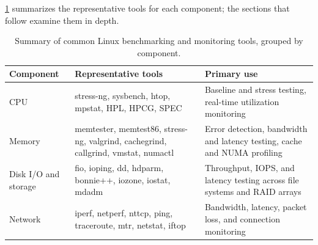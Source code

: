 \medskip

\cref{tab:benchmarking-tools} summarizes the representative tools for each component; the sections that follow examine them in depth.

\begin{table}[H]
    \centering
    \setlength{\tabcolsep}{4pt}
    \renewcommand{\arraystretch}{1.25}
    \begin{tcolorbox}[enhanced, colback=gray!5, boxrule=0.8pt, colframe=black, arc=0mm, left=0mm, right=0mm, top=0.6mm, bottom=0.6mm, boxsep=0mm, sharp corners=south]
        \small
    \begin{tabularx}{\textwidth}{
        >{\raggedright\arraybackslash}p{}
        >{\raggedright\arraybackslash}p{}
        >{\raggedright\arraybackslash}X
    }
        \rowcolor{gray!20}
        \textbf{Component} & \textbf{Representative tools} & \textbf{Primary use} \\
        \midrule
        CPU & \ttfamily\footnotesize{stress-ng}, \ttfamily\footnotesize{sysbench}, \ttfamily\footnotesize{htop}, \ttfamily\footnotesize{mpstat}, HPL, HPCG, SPEC & Baseline and stress testing, real-time utilization monitoring \\
        Memory & \ttfamily\footnotesize{memtester}, memtest86, \ttfamily\footnotesize{stress-ng}, \ttfamily\footnotesize{valgrind}, \ttfamily\footnotesize{cachegrind}, \ttfamily\footnotesize{callgrind}, \ttfamily\footnotesize{vmstat}, \ttfamily\footnotesize{numactl} & Error detection, bandwidth and latency testing, cache and NUMA profiling \\
        Disk I/O and storage & \ttfamily\footnotesize{fio}, \ttfamily\footnotesize{ioping}, \ttfamily\footnotesize{dd}, \ttfamily\footnotesize{hdparm}, \ttfamily\footnotesize{bonnie++}, \ttfamily\footnotesize{iozone}, \ttfamily\footnotesize{iostat}, \ttfamily\footnotesize{mdadm} & Throughput, IOPS, and latency testing across file systems and RAID arrays \\
        Network & \ttfamily\footnotesize{iperf}, \ttfamily\footnotesize{netperf}, \ttfamily\footnotesize{nttcp}, \ttfamily\footnotesize{ping}, \ttfamily\footnotesize{traceroute}, \ttfamily\footnotesize{mtr}, \ttfamily\footnotesize{netstat}, \ttfamily\footnotesize{iftop} & Bandwidth, latency, packet loss, and connection monitoring \\
    \end{tabularx}
    \end{tcolorbox}
    \caption{Summary of common Linux benchmarking and monitoring tools, grouped by component.}
    \label{tab:benchmarking-tools}
\end{table}


